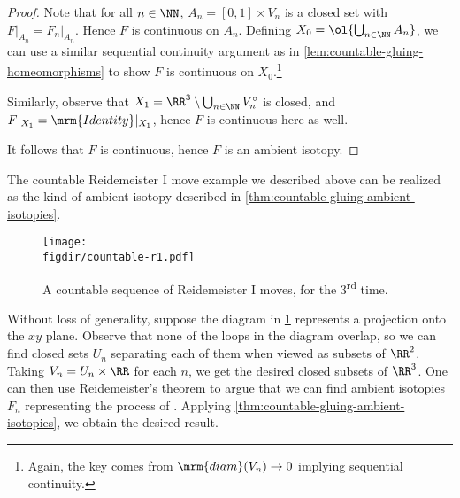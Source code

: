 \begin{proof}
  Note that for all $n \in\NN$, $A_n = [0,1] \times V_n$ is a closed
  set with $F\vert_{A_n}= F_n\vert_{A_n}$. Hence $F$ is continuous on
  $A_n$. Defining $X_0 = \ol{\bigcup_{n\in\NN} A_n}$, we can use a
  similar sequential continuity argument as in
  \cref{lem:countable-gluing-homeomorphisms} to show $F$ is continuous
  on $X_0$.\footnote{Again, the key comes from $\mrm{diam}(V_n) \to 0$
    implying sequential continuity.}

  Similarly, observe that $X_1 = \RR^3 \setminus
  \bigcup_{n\in\NN}V_n^\circ$ is closed, and $F\vert_{X_1} =
  \mrm{Identity}\vert_{X_1}$, hence $F$ is continuous here as well.

  It follows that $F$ is continuous, hence $F$ is an ambient isotopy.
\end{proof}
\begin{proposition}\label{prop:countable-r1-is-valid}
  The countable Reidemeister I move example we described above can be
  realized as the kind of ambient isotopy described in
  \cref{thm:countable-gluing-ambient-isotopies}.
\end{proposition}
\begin{figure}[H]
  \centering
  \texttt{[image: \\figdir/countable-r1.pdf]}
  \caption[Countable Reidmeister I Moves]{A countable sequence of
    Reidemeister I moves, for the 3\textsuperscript{rd} time.}
  \label{fig:countable-r1}
\end{figure}
\begin{sproof}[Sketch]
  Without loss of generality, suppose the diagram in
  \cref{fig:countable-r1} represents a projection onto the $xy$ plane.
  Observe that none of the loops in the diagram overlap, so we can
  find closed sets $U_n$ separating each of them when viewed as
  subsets of $\RR^2$. Taking $V_n = U_n \times \RR$ for each $n$, we
  get the desired closed subsets of $\RR^3$. One can then use
  Reidemeister's theorem to argue that we can find ambient isotopies
  $F_n$ representing the process of . Applying
  \cref{thm:countable-gluing-ambient-isotopies}, we obtain the desired
  result.
\end{sproof}
